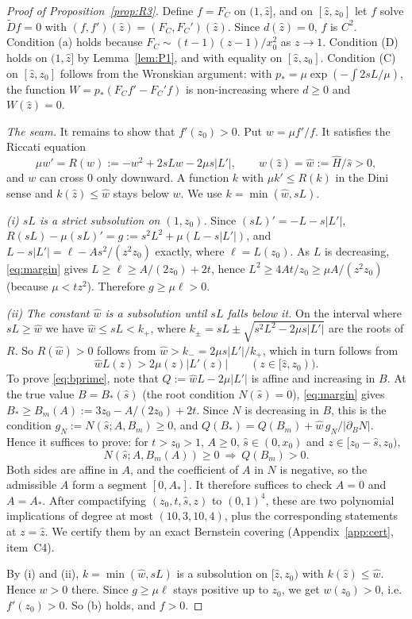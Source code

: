 \documentclass[11pt]{amsart}
\theoremstyle{definition}
\theoremstyle{remark}
\numberwithin{equation}{section}
\begin{document}
\begin{proof}[Proof of Proposition~\ref{prop:R3}]
Define $f=F_C$ on $(1,\hat z]$, and on $[\hat z,z_0]$ let $f$ solve $\widetilde Df=0$ with
$(f,f')(\hat z)=(F_C,F_C')(\hat z)$. Since $d(\hat z)=0$, $f$ is $C^2$. Condition (a) holds because
$F_C\sim(t-1)(z-1)/x_0^2$ as $z\to1$. Condition (D) holds on $(1,\hat z]$ by Lemma~\ref{lem:P1}, and with equality
on $[\hat z,z_0]$. Condition (C) on $[\hat z,z_0]$ follows from the Wronskian argument: with
$p_*=\mu\exp(-\int2sL/\mu)$, the function $W=p_*(F_Cf'-F_C'f)$ is non-increasing where $d\ge0$ and $W(\hat z)=0$.

\emph{The seam.} It remains to show that $f'(z_0)>0$. Put $w=\mu f'/f$. It satisfies the Riccati equation
\begin{equation}\label{eq:riccati}
\mu w'=R(w):=-w^2+2sLw-2\mu s|L'|,\qquad w(\hat z)=\hat w:=\hat H/\hat s>0,
\end{equation}
and $w$ can cross $0$ only downward. A function $k$ with $\mu k'\le R(k)$ in the Dini sense and $k(\hat z)\le\hat w$
stays below $w$. We use $k=\min(\hat w,sL)$.

\emph{(i) $sL$ is a strict subsolution on $(1,z_0)$.} Since $(sL)'=-L-s|L'|$,
$R(sL)-\mu(sL)'=g:=s^2L^2+\mu(L-s|L'|)$, and $L-s|L'|=\ell-As^2/(z^2z_0)$ exactly, where $\ell=L(z_0)$. As $L$ is
decreasing, \eqref{eq:margin} gives $L\ge\ell\ge A/(2z_0)+2t$, hence $L^2\ge4At/z_0\ge\mu A/(z^2z_0)$ (because
$\mu<tz^2$). Therefore $g\ge\mu\ell>0$.

\emph{(ii) The constant $\hat w$ is a subsolution until $sL$ falls below it.} On the interval where $sL\ge\hat w$ we have
$\hat w\le sL<k_+$, where $k_\pm=sL\pm\sqrt{s^2L^2-2\mu s|L'|}$ are the roots of $R$. So $R(\hat w)>0$ follows from
$\hat w>k_-=2\mu s|L'|/k_+$, which in turn follows from
\begin{equation}\label{eq:bprime}
\hat wL(z)>2\mu(z)|L'(z)|\qquad(z\in[\hat z,z_0)).
\end{equation}
To prove \eqref{eq:bprime}, note that $Q:=\hat wL-2\mu|L'|$ is affine and increasing in $B$. At the true value
$B=B_*(\hat s)$ (the root condition $N(\hat s)=0$), \eqref{eq:margin} gives $B_*\ge B_m(A):=3z_0-A/(2z_0)+2t$. Since
$N$ is decreasing in $B$, this is the condition $g_N:=N(\hat s;A,B_m)\ge0$, and
$Q(B_*)=Q(B_m)+\hat w\,g_N/|\partial_BN|$. Hence it suffices to prove: for $t>z_0>1$, $A\ge0$, $\hat s\in(0,x_0)$
and $z\in[z_0-\hat s,z_0)$,
\[
N(\hat s;A,B_m(A))\ge0\ \Longrightarrow\ Q(B_m)>0 .
\]
Both sides are affine in $A$, and the coefficient of $A$ in $N$ is negative, so the admissible $A$ form a segment
$[0,A_*]$. It therefore suffices to check $A=0$ and $A=A_*$. After compactifying $(z_0,t,\hat s,z)$ to $(0,1)^4$,
these are two polynomial implications of degree at most $(10,3,10,4)$, plus the corresponding statements at
$z=\hat z$. We certify them by an exact Bernstein covering (Appendix~\ref{app:cert}, item~C4).

By (i) and (ii), $k=\min(\hat w,sL)$ is a subsolution on $[\hat z,z_0)$ with $k(\hat z)\le\hat w$. Hence $w>0$
there. Since $g\ge\mu\ell$ stays positive up to $z_0$, we get $w(z_0)>0$, i.e. $f'(z_0)>0$.
So (b) holds, and $f>0$.
\end{proof}
\end{document}
